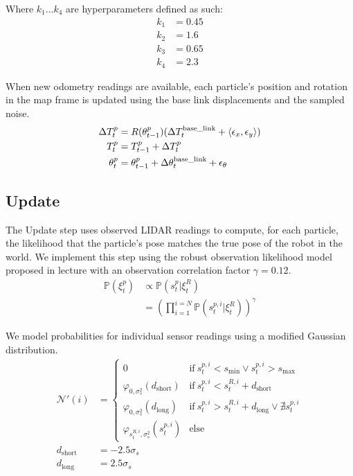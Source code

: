 \documentclass[11pt]{article}
\begin{document}
Where $k_1 \dots k_4$ are hyperparameters defined as such:
\begin{align*}
    k_1 &= 0.45 \\
    k_2 &= 1.6 \\
    k_3 &= 0.65 \\
    k_4 &= 2.3
\end{align*}

\noindent
When new odometry readings are available, each particle's position and rotation
in the map frame is updated using the base link displacements and the sampled
noise.
\begin{align*}
    \Delta T^{p}_t
        &= R(\theta^p_{t-1}) (\Delta T^{\textrm{base\_link}}_{t} + \langle \epsilon_x, \epsilon_y \rangle) \\
    T^p_t &= T^p_{t - 1} + \Delta T^{p}_t \\
    \theta^p_t &= \theta^p_{t - 1} + \Delta \theta^{\textrm{base\_link}}_t + \epsilon_\theta
\end{align*}

\subsection{Update}

\def\smin{s_{\textrm{min}}}
\def\smax{s_{\textrm{max}}}
\def\Pr{\mathbb{P}}
\def\dshort{d_{\textrm{short}}}
\def\dlong{d_{\textrm{long}}}

The Update step uses observed LIDAR readings to compute, for each particle, the
likelihood that the particle's pose matches the true pose of the robot in the
world. We implement this step using the robust observation likelihood model
proposed in lecture with an observation correlation factor $\gamma = 0.12$.
\begin{align*}
    \Pr(\xi^{p}_t) &\propto \Pr(s^p_t | \xi^{R}_t) \\
    &= \left( \prod_{i=1}^{i=N} \Pr(s^{p, i}_t | \xi^{R}_t) \right)^\gamma
\end{align*}

\noindent
We model probabilities for individual sensor readings using a modified Gaussian
distribution.
\begin{align*}
    \mathcal{N}'(i) &=
        \begin{cases}
            0 & \mathrm{if\ } s^{p,i}_t < \smin \lor s^{p,i}_t > \smax \\
            \varphi_{0, \sigma_s^2}(\dshort) & \mathrm{if\ } s^{p,i}_t < s^{R,i}_t + \dshort \\
            \varphi_{0, \sigma_s^2}(\dlong) & \mathrm{if\ } s^{p,i}_t > s^{R,i}_t + \dlong \lor \nexists s^{p,i}_t \\
            \varphi_{s^{R,i}_t, \sigma_s^2}(s^{p,i}_t) & \mathrm{else}
        \end{cases} \\
    \dshort &= -2.5 \sigma_s \\
    \dlong &= 2.5 \sigma_s
\end{align*}
\end{document}
